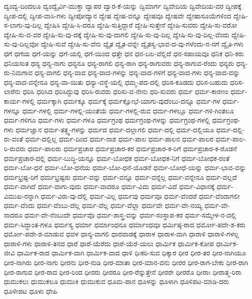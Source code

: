 {ದ್ವಂದ್ವ-ದಿಂದಲೂ
ದ್ವಂದ್ವೈರ್ವಿ-ಮುಕ್ತಾ
ದ್ವಾಪರ
ದ್ವಾರ-ಕೆ-ಯನ್ನು
ದ್ವಿಮಾರ್ಗ
ದ್ವಿವೇದಿಯ
ದ್ವಿವೇದಿಯ-ವರ
ದ್ವೀಪಕ್ಕೆ
ದ್ವೀಪ-ದಲ್ಲಿ
ದ್ವೀಪ-ವಾಸಿ-ಗಳು
ದ್ವೀಪೋದ್ಯಾನ
ದ್ವೇಷ
ದ್ವೇಷ-ವನ್ನೂ
ದ್ವೇಷವೂ
ದ್ವೇಷವೇ
ದ್ವೇಷಾಸೂಯೆಗಳಿಂದ
ದ್ವೇಷಿ-ಸ-ಲಾಗು-ವು-ದಿಲ್ಲ
ದ್ವೇಷಿಸಿ
ದ್ವೇಷಿ-ಸಿ-ದರೂ
ದ್ವೇಷಿ-ಸುತ್ತಿದ್ದಾರೆ
ದ್ವೇಷಿ-ಸುತ್ತೇನೆ
ದ್ವೇಷಿ-ಸುವರು
ದ್ವೇಷಿ-ಸು-ವರೋ
ದ್ವೇಷಿ-ಸು-ವ-ವರ
ದ್ವೇಷಿ-ಸು-ವು-ದಕ್ಕೆ
ದ್ವೇಷಿ-ಸು-ವು-ದಾಗಲಿ
ದ್ವೇಷಿ-ಸು-ವು-ದಿಲ್ಲ
ದ್ವೇಷಿ-ಸು-ವು-ದಿಲ್ಲ-ವೆಂದು
ದ್ವೇಷಿ-ಸು-ವು-ದಿಲ್ಲವೋ
ದ್ವೇಷಿ-ಸುವೆ
ದ್ವೇಷಿ-ಸು-ವೆನು
ದ್ವೈತ
ದ್ವೈತ-ವನ್ನೇ
ದ್ವೈತಸ್ವ-ಭಾವ-ದ-ವು-ಗಳೆಂದು-ನ-ನಗೆ
ದ್ವೈತಿ-ಗಳು
ಧಗೆ
ಧಗೆಯ
ಧಗೆ-ಯನ್ನು
ಧಗೆ-ಯಲ್ಲಿ
ಧಗೆ-ಯಿಂದ
ಧತ್ತೇ
ಧನ
ಧನ-ಬಲ-ವೆಲ್ಲಿದೆ
ಧನ-ಸಹಾಯವೂ
ಧನಿಕ
ಧನಿ-ಕರು
ಧನಿಯಸುತ
ಧನ್ಯ
ಧನ್ಯ-ನಾಗು
ಧನ್ಯನೂ
ಧನ್ಯ-ರಾಗಲಿ
ಧನ್ಯ-ರಾಗಿ
ಧನ್ಯ-ರಾಗುವರು
ಧನ್ಯ-ರಾಗುವ-ರೆಂದು
ಧನ್ಯರು
ಧನ್ಯ-ರು-ನಿಮಗಾವ
ಧನ್ಯ-ವಾಗಲಿ
ಧನ್ಯ-ವಾದ
ಧನ್ಯ-ವಾದ-ಗಳನ್ನು
ಧನ್ಯ-ವಾದ-ಗಳಿಗೆ
ಧನ್ಯ-ವಾದ-ಗಳು
ಧನ್ಯ-ವಾದ-ವನ್ನು
ಧನ್ಯ-ವಾದ-ವನ್ನೇನೂ
ಧನ್ಯ-ವಾ-ಯಿತು
ಧನ್ಯಾ-ವಸ್ಥೆ-ಯಲ್ಲಿ
ಧಮ್ಮ-ಪದ-ದಲ್ಲಿ
ಧರಿಸ-ಕೂಡದು
ಧರಿಸ-ಬಹುದು
ಧರಿಸ-ಲಾರೆನು
ಧರಿಸಿ
ಧರಿಸಿದ
ಧರಿಸಿದ್ದುವು
ಧರಿಸಿ-ರುವರು
ಧರಿಸು-ವ-ನೇನು
ಧರಿ-ಸುವರು
ಧರ್ಮ
ಧರ್ಮ-ಕಾರಣಂ
ಧರ್ಮ-ಕಾರ್ಯ-ಗಳಲ್ಲಿ
ಧರ್ಮಕ್ಕಾಗಿ
ಧರ್ಮಕ್ಕೂ
ಧರ್ಮಕ್ಕೆ
ಧರ್ಮಕ್ಷೋಭೆ-ಯಾಗು-ವುದೆಂಬು-ದನ್ನೂ
ಧರ್ಮ-ಗಳ
ಧರ್ಮ-ಗಳನ್ನೂ
ಧರ್ಮ-ಗಳಲ್ಲಿ
ಧರ್ಮ-ಗಳಲ್ಲಿ-ಯಂತೆಯೆ
ಧರ್ಮ-ಗಳಲ್ಲಿ-ರುವ
ಧರ್ಮ-ಗಳಲ್ಲೂ
ಧರ್ಮ-ಗಳಿ-ಗಿಂತಲೂ
ಧರ್ಮ-ಗಳಿಗೂ
ಧರ್ಮ-ಗಳು
ಧರ್ಮ-ಗಳೂ
ಧರ್ಮಗ್ರಂಥ
ಧರ್ಮಗ್ರಂಥ-ಗಳನ್ನು
ಧರ್ಮಗ್ರಂಥ-ಗಳಲ್ಲಿ
ಧರ್ಮಗ್ರಂಥ-ಗಳು
ಧರ್ಮಜ್ಞಾನ
ಧರ್ಮ-ತತ್ತ್ವ-ಗಳನ್ನು
ಧರ್ಮದ
ಧರ್ಮ-ದಲ್ಲಾಗಲಿ
ಧರ್ಮ-ದಲ್ಲಿ
ಧರ್ಮ-ದಲ್ಲಿಯೂ
ಧರ್ಮ-ದಲ್ಲಿ-ರು-ವಂತೆ
ಧರ್ಮ-ದಲ್ಲಿಲ್ಲ
ಧರ್ಮ-ದಿಂದ
ಧರ್ಮ-ನಾಶ
ಧರ್ಮ-ಪಾಲ
ಧರ್ಮ-ಪಾಲನ
ಧರ್ಮ-ಪಾಲರ
ಧರ್ಮ-ಪಾಲ-ರಿ-ರುವರು
ಧರ್ಮ-ಪಾಲರು
ಧರ್ಮಪ್ರಚಾರ
ಧರ್ಮಪ್ರಚಾರ-ಕರ
ಧರ್ಮಪ್ರಚಾರ-ಕ-ರಿಗೆ
ಧರ್ಮಪ್ರಚಾರ-ಕ-ರೊಡನೆ
ಧರ್ಮಪ್ರಚಾರ-ದಲ್ಲಿ
ಧರ್ಮ-ಬುದ್ಧಿ-ಯನ್ನೂ
ಧರ್ಮ-ಬೋಧಕ
ಧರ್ಮ-ಬೋಧಕ-ನಿಗೆ
ಧರ್ಮ-ಬೋಧಕ-ರಂತೆ
ಧರ್ಮ-ಬೋ-ಧನೆ
ಧರ್ಮ-ಬೋ-ಧನೆಯ
ಧರ್ಮ-ಬೋ-ಧನೆ-ಯೊಡನೆ
ಧರ್ಮ-ಬೋಧೆ-ಯನ್ನು
ಧರ್ಮ-ಭಾವ-ವನ್ನು
ಧರ್ಮಭ್ರಷ್ಟ-ರಿಗೆ
ಧರ್ಮಭ್ರಷ್ಟರು
ಧರ್ಮ-ವನ್ನು
ಧರ್ಮ-ವನ್ನೂ
ಧರ್ಮ-ವನ್ನೆಲ್ಲ
ಧರ್ಮ-ವನ್ನೇನೂ
ಧರ್ಮ-ವಲ್ಲದೆ
ಧರ್ಮ-ವಾಗಿದೆ
ಧರ್ಮ-ವಾಗು-ವುದು
ಧರ್ಮ-ವಾದರೂ
ಧರ್ಮ-ವಿದು
ಧರ್ಮ-ವಿದೆ
ಧರ್ಮ-ವಿಧಾನಕ್ಕೆ
ಧರ್ಮ-ವಿಮುಖ-ನನ್ನಾಗಿ
ಧರ್ಮ-ವಿರು-ವು-ದೆಲ್ಲಿ
ಧರ್ಮ-ವಿಲ್ಲ
ಧರ್ಮವು
ಧರ್ಮವೂ
ಧರ್ಮ-ವೆಂದರೆ
ಧರ್ಮ-ವೆಂದಾಗಲೀ
ಧರ್ಮ-ವೆಂದು
ಧರ್ಮ-ವೆಂಬು-ದೆಲ್ಲ
ಧರ್ಮ-ವೆಲ್ಲ
ಧರ್ಮ-ವೆಲ್ಲಾ
ಧರ್ಮವೇ
ಧರ್ಮ-ವೇ-ನಯ್ಯ
ಧರ್ಮ-ವೇ-ನಾದರೂ
ಧರ್ಮ-ವೇ-ನೆಂಬುದೇ
ಧರ್ಮವೊ
ಧರ್ಮ-ಶಾಸ್ತ್ರ-ವನ್ನು
ಧರ್ಮ-ಸಂಸ್ಥಾಪ-ಕರ
ಧರ್ಮ-ಸಮ್ಮೇಳ-ನ-ದಲ್ಲಿ
ಧರ್ಮ-ಸಿದ್ಧಾಂತ-ಗಳೂ
ಧರ್ಮಸ್ಯ
ಧರ್ಮಾ
ಧರ್ಮಾಂಧನೂ
ಧರ್ಮಾಂಧವೂ
ಧರ್ಮಿಷ್ಠ-ರಾದ
ಧರ್ಮೋ-ಪದೇ-ಶ-ಕರು
ಧರ್ಮೋ-ಪದೇ-ಶ-ಮಾಡುವ
ಧವಳ
ಧಾನ್ಯ-ವಾಗಲಿ
ಧಾರವಾಡಕ್ಕೆ
ಧಾರಾಳ
ಧಾರಾಳ-ವಾಗಿ
ಧಾರಾಳಿ
ಧಾರಾಳಿ-ಗಳಲ್ಲ
ಧಾರಾಳಿ-ಗಳು
ಧಾರಾಳಿ-ತನದ
ಧಾರೆ
ಧಾರೆ-ಯೆರೆದು
ಧಾರೆ-ಯೆರೆ-ಯಲು
ಧಾರ್ಮಿಕ
ಧಾರ್ಮಿಕ-ಕೋಪ
ಧಾರ್ಮಿಕ-ಜೀವಿ
ಧಾರ್ಮಿಕ-ರಾದ
ಧಾರ್ಮಿಕ-ವಾಗಿ
ಧಾರ್ಮಿಕ-ವಾದ
ಧಾಳಿ
ಧಿಃಕರಿ-ಸುವ
ಧಿಕ್ಕಾರ
ಧೀರ
ಧೀರ-ತರ
ಧೀರ-ನಾಗಿಯೂ
ಧೀರ-ನಾಗಿರು
ಧೀರ-ನಾಗು
ಧೀರನು
ಧೀರ-ನುಡಿ
ಧೀರ-ಮಾತಾ
ಧೀರ-ಮಾನ-ವನು
ಧೀರರ
ಧೀರ-ರಾಗ-ಬೇಕು
ಧೀರ-ರಾಗಿ
ಧೀರ-ರಾಗುವ
ಧೀರ-ರಾದ
ಧೀರ-ರಿಂದ
ಧೀರರು
ಧೀರರೂ
ಧೀರ-ರೆನ್ನುತ್ತೇನೆ
ಧೀರರೇ
ಧೀರರೊ
ಧೀರಾಃ
ಧೀರಾತ್ಮ-ರಿರಾ
ಧುಮುಕಲು
ಧುಮುಕಲೂ
ಧುಮುಕಿ
ಧುಮುಕುವ
ಧೂಮ-ಪಾನ
ಧೂಳನ್ನು
ಧೂಳಾಗಿ
ಧೂಳಿಪಟ-ಮಾಡಿ-ದರು
ಧೂಳೀಪಟ
ಧೂಳು
ಧೇಹಿ
}
